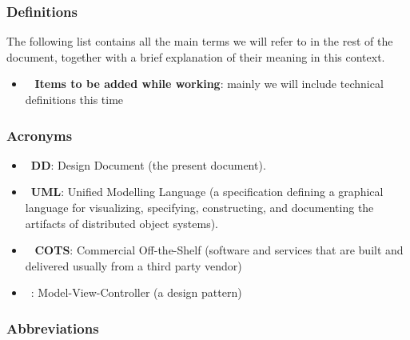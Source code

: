 \subsubsection{Definitions}

The following list contains all the main terms we will refer to in the rest of the document, together with a brief explanation of their meaning in this context.

\begin{itemize}
\item~ \textbf{Items to be added while working}: mainly we will include technical definitions this time
\end{itemize}

\subsubsection{Acronyms}

\begin{itemize}
\item~\textbf{DD}: Design Document (the present document).
\item~\textbf{UML}: Unified Modelling Language (a specification defining a graphical language for visualizing, specifying, constructing, and documenting the artifacts of distributed object systems).
\item~ \textbf{COTS}: Commercial Off-the-Shelf (software and services that are built and delivered usually from a third party vendor)
\item~: Model-View-Controller (a design pattern)
\end{itemize}

\subsubsection{Abbreviations}

